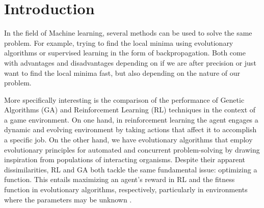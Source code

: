\section{Introduction}



In the field of Machine learning, several methods can be used to solve the same problem. For example, trying to find the local minima using evolutionary algorithms or supervised learning in the form of backpropagation. Both come with advantages and disadvantages depending on if we are after precision or just want to find the local minima fast, but also depending on the nature of our problem.

More specifically interesting is the comparison of the performance of Genetic Algorithms (GA) and Reinforcement Learning (RL) techniques in the context of a game environment. On one hand, in reinforcement learning the agent engages a dynamic and evolving environment by taking actions that affect it to accomplish a specific job. On the other hand, we have evolutionary algorithms that employ evolutionary principles for automated and concurrent problem-solving by drawing inspiration from populations of interacting organisms. Despite their apparent dissimilarities, RL and GA both tackle the same fundamental issue: optimizing a function. This entails maximizing an agent's reward in RL and the fitness function in evolutionary algorithms, respectively, particularly in environments where the parameters may be unknown \cite{drugan2019reinforcement}. 

